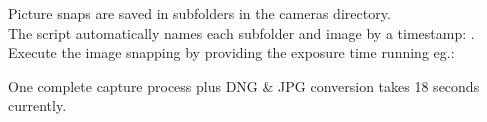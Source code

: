 Picture snaps are saved in subfolders in the cameras  directory.\\

The script automatically names each subfolder and image by a timestamp:  .\\

Execute the image snapping by providing the exposure time running eg.: 


One complete capture process plus DNG \& JPG conversion takes 18 seconds currently.\\
